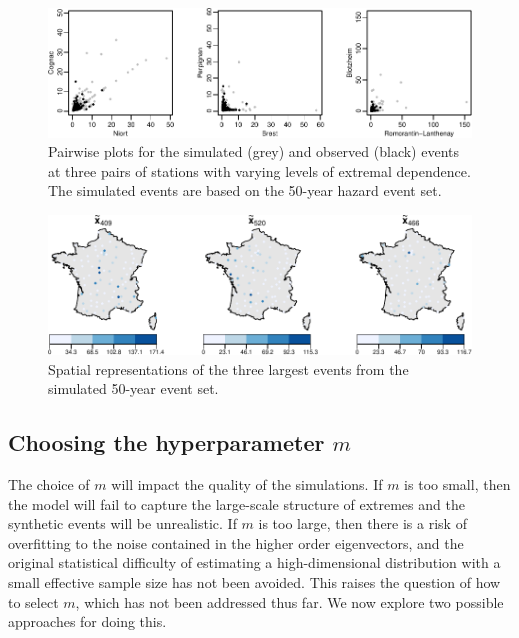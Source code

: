 \documentclass[en-GB, a4paper, nobind]{templates/bathreport}
\begin{document}
\begin{figure}

{\centering \includegraphics[width=1\linewidth]{figures/fr-sim-obs-pairwise-1} 

}

\caption[Simulated and observed events at three pairs of stations.]{Pairwise plots for the simulated (grey) and observed (black) events at three pairs of stations with varying levels of extremal dependence. The simulated events are based on the 50-year hazard event set. }\label{fig:fr-sim-obs-pairwise}
\end{figure}

\begin{figure}

{\centering \includegraphics[width=1\linewidth]{figures/fr-sim-event-map-1} 

}

\caption[Spatial representations of the largest three simulated events.]{Spatial representations of the three largest events from the simulated 50-year event set.}\label{fig:fr-sim-event-map}
\end{figure}

\hypertarget{fr-tuning-m}{%
\subsection{\texorpdfstring{Choosing the hyperparameter \(m\)}{Choosing the hyperparameter m}}\label{fr-tuning-m}}

The choice of \(m\) will impact the quality of the simulations. If \(m\) is too small, then the model will fail to capture the large-scale structure of extremes and the synthetic events will be unrealistic. If \(m\) is too large, then there is a risk of overfitting to the noise contained in the higher order eigenvectors, and the original statistical difficulty of estimating a high-dimensional distribution with a small effective sample size has not been avoided. This raises the question of how to select \(m\), which has not been addressed thus far. We now explore two possible approaches for doing this.
\end{document}
